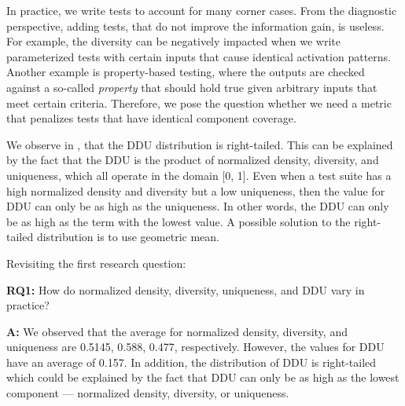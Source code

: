\documentclass[twoside,a4paper,11pt]{memoir}
\begin{document}

In practice, we write tests to account for many corner cases.
From the diagnostic perspective, adding tests, that do not improve the information gain, is useless.
For example, the diversity can be negatively impacted when we write parameterized tests with certain inputs that cause identical activation patterns.
Another example is property-based testing, where the outputs are checked against a so-called \emph{property} that should hold true given arbitrary inputs that meet certain criteria.
Therefore, we pose the question whether we need a metric that penalizes tests that have identical component coverage.


We observe in , that the DDU distribution is right-tailed.
This can be explained by the fact that the DDU is the product of normalized density, diversity, and uniqueness, which all operate in the domain [0, 1].
Even when a test suite has a high normalized density and diversity but a low uniqueness, then the value for DDU can only be as high as the uniqueness.
In other words, the DDU can only be as high as the term with the lowest value.
A possible solution to the right-tailed distribution is to use geometric mean.

%

Revisiting the first research question:
\begin{framed}
\noindent
\textbf{RQ1:} How do normalized density, diversity, uniqueness, and DDU vary in practice?
\end{framed}
\textbf{A:} We observed that the average for normalized density, diversity, and uniqueness are 0.5145, 0.588, 0.477, respectively.
However, the values for DDU have an average of 0.157.
In addition, the distribution of DDU is right-tailed which could be explained by the fact that DDU can only be as high as the lowest component --- normalized density, diversity, or uniqueness.
\end{document}
